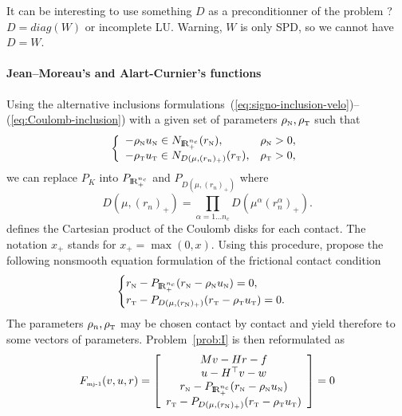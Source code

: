 \begin{ndrva}
  It can be interesting to use something $D$ as a preconditionner of the problem ? $D=diag(W)$ or incomplete LU. Warning, $W$ is only SPD, so we cannot have $D =W$.
\end{ndrva}

\paragraph{Jean--Moreau's and Alart-Curnier's functions}

Using the alternative inclusions formulations~(\ref{eq:signo-inclusion-velo})--(\ref{eq:Coulomb-inclusion}) with a given set of parameters $\rho_{\hbox{\tiny{N}}},\rho_{\hbox{\tiny{T}}}$ such that
\begin{equation} 
  \label{eq:inclusion-rhorho}
  \left\{ \begin{array}{ll}
    -\rho_\n u_\n \in N_{\RR^{n_c}_+}(r_\n), & \rho_\n>0, \\
    -\rho_\t u_{\t} \in N_{D(\mu,(r_{n})_+)}(r_\t), & \rho_\t>0,
  \end{array}\right.
\end{equation}
 we can replace $P_K$ into $P_{\mathrm{I\!R}^{n_c}_+}$ and $P_{D(\mu,(r_{n})_+)}$ where 
\begin{equation}
  \label{eq:diskR-prod}
  D(\mu,(r_{n})_+) = \prod_{\alpha=1\ldots n_c} D(\mu^{\alpha} (r_{n}^\alpha)_+).
\end{equation}
defines the Cartesian product of the Coulomb disks for each contact. The notation $x_+$ stands for $x_+ = \max(0,x)$. Using this procedure, \citet{Jean.Moreau1987} propose the following nonsmooth equation formulation of the frictional contact condition
\begin{equation}
  \label{eq:Moreau--Jean-1}
    \begin{cases}
    r_\n - P_{\RR^{n_c}_+}(r_\n - \rho_\n  u_\n) = 0, \\
    r_\t - P_{D(\mu, (r_{\n})_+)}(r_\t - \rho_\t u_\t   )=0.
  \end{cases}
\end{equation}
The parameters $\rho_n,\rho_{\hbox{\tiny{T}}}$ may be chosen contact by contact and yield therefore to some vectors of parameters. Problem~\ref{prob:I} is then reformulated as
\begin{equation}
  \label{eq:MJ-I}
  F_{\mjone}(v,u,r) = \left[
    \begin{array}{c}
    Mv - Hr - f \\
    u -  H^\top v - w \\
    r_\n - P_{\RR^{n_c}_+}(r_\n - \rho_\n u_\n) \\
    r_\t - P_{D(\mu, (r_{\n})_+)}(r_\t - \rho_\t u_\t   ) 
  \end{array}\right] =0
\end{equation}
